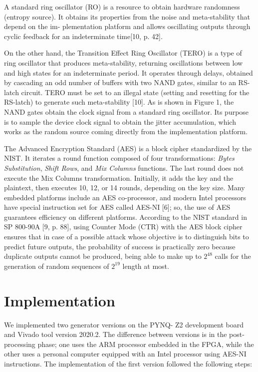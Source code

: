 \documentclass[journal]{IEEEtran}
\begin{document}
A standard ring oscillator (RO) is a resource to obtain hardware randomness (entropy source). It obtains its properties from the noise and meta-stability that depend on the im- plementation platform and allows oscillating outputs through cyclic feedback for an indeterminate time[10, p. 42].

On the other hand, the Transition Effect Ring Oscillator (TERO) is a type of ring oscillator that produces meta-stability, returning oscillations between low and high states for an indeterminate period. It operates through delays, obtained by cascading an odd number of buffers with two NAND gates, similar to an RS-latch circuit. TERO must be set to an illegal state (setting and resetting for the RS-latch) to generate such meta-stability [10]. As is shown in Figure 1, the NAND gates obtain the clock signal from a standard ring oscillator. Its purpose is to sample the device clock signal to obtain the jitter accumulation, which works as the random source coming directly from the implementation platform.

The Advanced Encryption Standard (AES) is a block cipher standardized by the NIST. It iterates a round function composed of four transformations: \textit{Bytes Substitution}, \textit{Shift Rows}, and \textit{Mix Columns} functions. The last round does not execute the Mix Columns transformation. Initially, it adds the key and the plaintext, then executes 10, 12, or 14 rounds, depending on the key size. Many embedded platforms include an AES co-processor, and modern Intel processors have special instruction set for AES called AES-NI [6]; so, the use of AES guarantees efficiency on different platforms. According to the NIST standard in SP 800-90A [9, p. 88], using Counter Mode (CTR) with the AES block cipher ensures that in case of a possible attack whose objective is to distinguish bits to predict future outputs, the probability of success is practically zero because duplicate outputs cannot be produced, being able to make up to $2^{48}$ calls for the generation of random sequences of $2^{19}$ length at most.

\section{Implementation}

We implemented two generator versions on the PYNQ- Z2 development board and Vivado tool version 2020.2. The difference between versions is in the post-processing phase; one uses the ARM processor embedded in the FPGA, while the other uses a personal computer equipped with an Intel processor using AES-NI instructions. The implementation of the first version followed the following steps:
\end{document}
